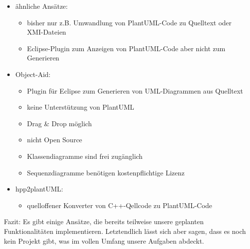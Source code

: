 \begin{itemize}
	\item ähnliche Ansätze:
	\begin{itemize}
		\item bisher nur z.B. Umwandlung von PlantUML-Code zu Quelltext oder XMI-Dateien
		\item Eclipse-Plugin zum Anzeigen von PlantUML-Code aber nicht zum Generieren
	\end{itemize}
	\item Object-Aid:
		\begin{itemize}
			\item Plugin für Eclipse zum Generieren von UML-Diagrammen aus Quelltext
			\item keine Unterstützung von PlantUML
			\item Drag \& Drop möglich
			\item nicht Open Source
			\item Klassendiagramme sind frei zugänglich
			\item Sequenzdiagramme benötigen kostenpflichtige Lizenz
		\end{itemize}
	\item hpp2plantUML:
		\begin{itemize}
			\item quelloffener Konverter von C++-Qellcode zu PlantUML-Code
		\end{itemize}
\end{itemize}
Fazit:
Es gibt einige Ansätze, die bereits teilweise unsere geplanten Funktionalitäten implementieren.
Letztendlich lässt sich aber sagen, dass es noch kein Projekt gibt, was im vollen Umfang unsere Aufgaben abdeckt.
\nsecend